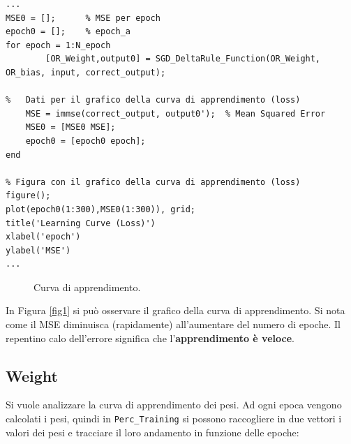 \documentclass[a4paper,11pt]{article}
\begin{document}
\begin{lstlisting}[style=Matlab-editor,title=\texttt{Perc\_Training.mat}]
...
MSE0 = [];      % MSE per epoch
epoch0 = [];    % epoch_a
for epoch = 1:N_epoch
        [OR_Weight,output0] = SGD_DeltaRule_Function(OR_Weight, OR_bias, input, correct_output);

%   Dati per il grafico della curva di apprendimento (loss)
    MSE = immse(correct_output, output0');  % Mean Squared Error
    MSE0 = [MSE0 MSE];
    epoch0 = [epoch0 epoch];
end

% Figura con il grafico della curva di apprendimento (loss)
figure();
plot(epoch0(1:300),MSE0(1:300)), grid;
title('Learning Curve (Loss)')
xlabel('epoch')
ylabel('MSE')
...
\end{lstlisting}

\begin{figure}[htb]
    \centering
    \caption{Curva di apprendimento.}
    \label{fig1}
\end{figure}

In Figura \vref{fig1} si può osservare il grafico della curva di apprendimento. Si nota come il MSE diminuisca (rapidamente) all'aumentare del numero di epoche. Il repentino calo dell'errore significa che l'\textbf{apprendimento è veloce}.


\subsection{Weight}

Si vuole analizzare la curva di apprendimento dei pesi. Ad ogni epoca vengono calcolati i pesi, quindi in \texttt{Perc\_Training} si possono raccogliere in due vettori i valori dei pesi e tracciare il loro andamento in funzione delle epoche:
\end{document}
